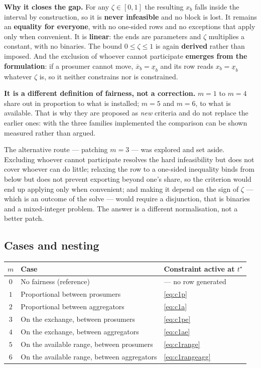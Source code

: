 \documentclass[11pt,a4paper]{article}
\newcommand{\nw}[1]{\textcolor{uaired}{#1}}
\newcommand{\prop}[1]{\textcolor{propblue}{#1}}
\newcommand{\tstar}{t^{\star}}
\begin{document}
\begin{keybox}
\prop{\textbf{Why it closes the gap.}} \prop{For any $\zeta\in[0,1]$ the resulting $x_b$ falls inside
the interval by construction, so it is \textbf{never infeasible} and no block is lost. It remains an
\textbf{equality for everyone}, with no one-sided rows and no exceptions that apply only when
convenient. It is \textbf{linear}: the ends are parameters and $\zeta$ multiplies a constant, with no
binaries. The bound $0\le\zeta\le1$ is again \textbf{derived} rather than imposed. And the exclusion
of whoever cannot participate \textbf{emerges from the formulation}: if a prosumer cannot move,
$\overline{x}_b=\underline{x}_b$ and its row reads $x_b=\underline{x}_b$ whatever $\zeta$ is, so it
neither constrains nor is constrained.}

\prop{\textbf{It is a different definition of fairness, not a correction.}} \prop{$m=1$ to $m=4$ share
out in proportion to what is installed; $m=5$ and $m=6$, to what is available. That is why they are
proposed as \emph{new} criteria and do not replace the earlier ones: with the three families
implemented the comparison can be shown measured rather than argued.}
\end{keybox}

\vspace{2pt}
\prop{The alternative route --- patching $m=3$ --- was explored and set aside. Excluding whoever
cannot participate resolves the hard infeasibility but does not cover whoever can do little; relaxing
the row to a one-sided inequality binds from below but does not prevent exporting beyond one's share,
so the criterion would end up applying only when convenient; and making it depend on the sign of
$\zeta$ --- which is an outcome of the solve --- would require a disjunction, that is binaries and a
mixed-integer problem. The answer is a different normalisation, not a better patch.}

\subsection{Cases and nesting}

\begin{center}\small
\begin{tabular}{c l l}
\toprule
$m$ & Case & Constraint active at $\tstar$\\
\midrule
$0$ & No fairness (reference) & --- no row generated\\
$1$ & \nw{Proportional between prosumers} & \nw{\eqref{eq:c1p}}\\
$2$ & \nw{Proportional between aggregators} & \nw{\eqref{eq:c1a}}\\
$3$ & \nw{On the exchange, between prosumers} & \nw{\eqref{eq:c1pe}}\\
$4$ & \nw{On the exchange, between aggregators} & \nw{\eqref{eq:c1ae}}\\
$5$ & \prop{On the available range, between prosumers} & \prop{\eqref{eq:c1range}}\\
$6$ & \prop{On the available range, between aggregators} & \prop{\eqref{eq:c1rangeagg}}\\
\bottomrule
\end{tabular}
\end{center}
\end{document}
